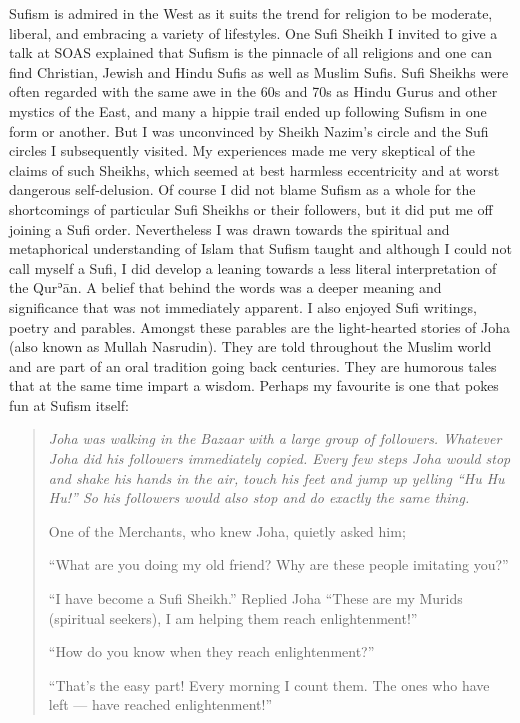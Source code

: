 \documentclass[12pt]{memoir}
\def\´{ʾ} %
\newcommand{\cor}[2]{#2} %
\def \Quran{Qur\-\´ān} %
\def\–{-\hskip0pt}
\begin{document}
Sufism is admired in the West as it suits the trend for religion
to be moderate, liberal, and embracing a variety of lifestyles.
One Sufi Sheikh I invited to give a talk at SOAS explained
that Sufism is the pinnacle of all religions and one can find
Christian, Jewish and Hindu Sufis as well as Muslim Sufis.
Sufi Sheikhs were often regarded with the same awe in the 60s and 70s
as Hindu Gurus and other mystics of the East,
and many a hippie trail ended up following Sufism in one form or another.
But I was unconvinced by Sheikh Nazim’s circle
and the Sufi circles I \cor{susequently}{subsequently} visited.
My experiences made me very skeptical of the claims of such Sheikhs,
which seemed at best harmless eccentricity
and at worst dangerous self\–delusion.
Of course I did not blame Sufism as a whole for the short\cor{-}{}comings
of particular Sufi Sheikhs or their followers,
but it did put me off joining a Sufi order.
Nevertheless I was drawn towards the spiritual and metaphorical understanding
of Islam that Sufism taught and although I could not call myself a Sufi,
I did develop a leaning towards a less literal interpretation of the \Quran.
A belief that behind the words was a deeper meaning and significance
that was not immediately apparent.
I also enjoyed Sufi writings, poetry and parables.
Amongst these parables are the light-hearted stories of Joha
(also known as Mullah Nasrudin).
They are told throughout the Muslim world
and are part of an oral tradition going back centuries.
They are \cor{humerous}{humorous} tales that at the same time impart a wisdom.
Perhaps my favourite is one that pokes fun at Sufism itself:

\begin{quote}
\itshape
Joha was walking in the Bazaar with a large group of followers.
Whatever Joha did his followers immediately copied.
Every few steps Joha would stop and shake his hands in the air,
touch his feet and jump up yelling “Hu Hu Hu!”
So his followers would also stop and do exactly the same thing.

One of the Merchants, who knew Joha, quietly asked him;

“What are you doing my old friend?
Why are these people imitating you?”

“I have become a Sufi Sheikh.”
Replied Joha “These are my Murids (spiritual seekers),
I am helping them reach enlightenment!”

“How do you know when they reach enlightenment?”

“That’s the easy part! Every morning I count them.
The ones who have left — have reached enlightenment!”
\end{quote}
\end{document}
